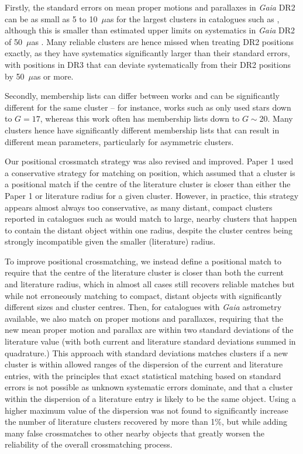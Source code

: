 Firstly, the standard errors on mean proper motions and parallaxes in \emph{Gaia} DR2 can be as small as 5 to 10~$\mu$as for the largest clusters in catalogues such as \cite{cantat-gaudin_clusters_2020}, although this is smaller than estimated upper limits on systematics in \emph{Gaia} DR2 of 50~$\mu$as \citep{lindegren_gaia_2018}. Many reliable clusters are hence missed when treating DR2 positions exactly, as they have systematics significantly larger than their standard errors, with positions in DR3 that can deviate systematically from their DR2 positions by 50~$\mu$as or more.

Secondly, membership lists can differ between works and can be significantly different for the same cluster -- for instance, works such as \cite{castro-ginard_hunting_2020} only used stars down to $G=17$, whereas this work often has membership lists down to $G\sim20$. Many clusters hence have significantly different membership lists that can result in different mean parameters, particularly for asymmetric clusters.

Our positional crossmatch strategy was also revised and improved. Paper 1 used a conservative strategy for matching on position, which assumed that a cluster is a positional match if the centre of the literature cluster is closer than either the Paper 1 or literature radius for a given cluster. However, in practice, this strategy appears almost always too conservative, as many distant, compact clusters reported in catalogues such as \cite{froebrich_systematic_2007} would match to large, nearby clusters that happen to contain the distant object within one radius, despite the cluster centres being strongly incompatible given the smaller (literature) radius.

To improve positional crossmatching, we instead define a positional match to require that the centre of the literature cluster is closer than both the current and literature radius, which in almost all cases still recovers reliable matches but while not erroneously matching to compact, distant objects with significantly different sizes and cluster centres. Then, for catalogues with \emph{Gaia} astrometry available, we also match on proper motions and parallaxes, requiring that the new mean proper motion and parallax are within two standard deviations of the literature value (with both current and literature standard deviations summed in quadrature.) This approach with standard deviations matches clusters if a new cluster is within allowed ranges of the dispersion of the current and literature entries, with the principles that exact statistical matching based on standard errors is not possible as unknown systematic errors dominate, and that a cluster within the dispersion of a literature entry is likely to be the same object. Using a higher maximum value of the dispersion was not found to significantly increase the number of literature clusters recovered by more than 1\%, but while adding many false crossmatches to other nearby objects that greatly worsen the reliability of the overall crossmatching process.

